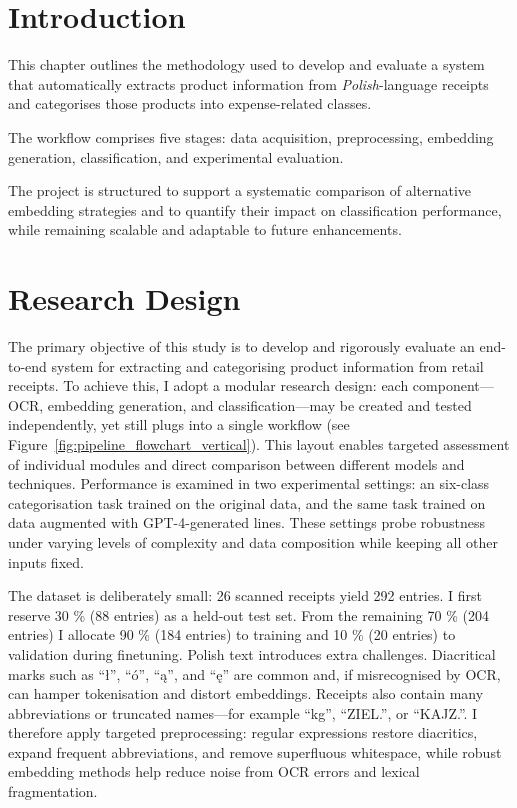 \documentclass{SGGW-thesis-EN}
\begin{document}
\section{Introduction}

This chapter outlines the methodology used to develop and evaluate a system that
automatically extracts product information from \textit{Polish}-language receipts and
categorises those products into expense-related classes.

The workflow comprises five stages: data acquisition, preprocessing, embedding generation,
classification, and experimental evaluation.

The project is structured to support a systematic comparison of alternative embedding
strategies and to quantify their impact on classification performance, while remaining
scalable and adaptable to future enhancements.


\section{Research Design}
The primary objective of this study is to develop and rigorously evaluate an end-to-end system for extracting and
categorising product information from retail receipts.  To achieve this, I adopt a modular research design: each
component—OCR, embedding generation, and classification—may be created and tested independently, yet still plugs into a
single workflow (see Figure~\ref{fig:pipeline_flowchart_vertical}).  This layout enables targeted assessment of individual modules and direct comparison between different
models and techniques.  Performance is examined in two experimental settings: an six-class categorisation task trained
on the original data, and the same task trained on data augmented with GPT-4-generated lines.
These settings probe robustness under varying levels of complexity and data composition while keeping all other inputs
fixed.

The dataset is deliberately small: 26 scanned receipts yield 292 entries.  I first reserve 30 \% (88 entries)
as a held-out test set.  From the remaining 70 \% (204 entries) I allocate 90 \% (184 entries) to training and 10 \%
(20 entries) to validation during finetuning.
Polish text introduces extra challenges.  Diacritical marks such as “ł”, “ó”, “ą”, and “ę” are common and, if
misrecognised by OCR, can hamper tokenisation and distort embeddings.  Receipts also contain many abbreviations or
truncated names—for example “kg”, “ZIEL.”, or “KAJZ.”.  I therefore apply targeted preprocessing: regular expressions
restore diacritics, expand frequent abbreviations, and remove superfluous whitespace, while robust embedding methods
help reduce noise from OCR errors and lexical fragmentation.
\end{document}
